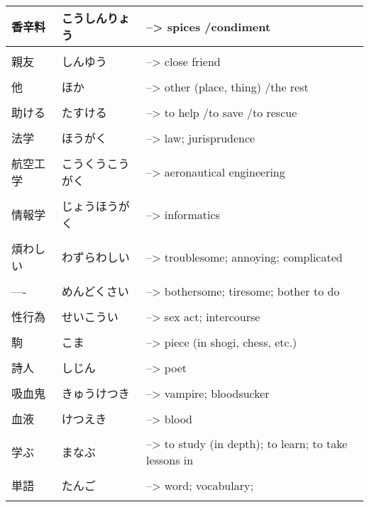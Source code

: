 \documentclass{article}
\begin{document}
\begin{tabular}{ l | l p{14cm} }
香辛料 &こうしんりょう &--> spices /condiment						\\ \hline\\[-1em]
親友 &しんゆう &--> close friend							\\ \hline\\[-1em]
他 &ほか &--> other (place, thing) /the rest			\\ \hline\\[-1em]
助ける &たすける &--> to help /to save /to rescue        \\ \hline\\[-1em]
法学 &ほうがく &--> law; jurisprudence  \\ \hline\\[-1em]
航空工学 &こうくうこうがく &--> aeronautical engineering   \\ \hline\\[-1em]
情報学 &じょうほうがく &--> informatics   \\ \hline\\[-1em]
煩わしい &わずらわしい &--> troublesome; annoying; complicated   \\ \hline\\[-1em]
---- &めんどくさい &--> bothersome; tiresome; bother to do   \\ \hline\\[-1em]
性行為 &せいこうい &--> sex act; intercourse   \\ \hline\\[-1em]
駒 &こま &--> piece (in shogi, chess, etc.)   \\ \hline\\[-1em]
詩人 &しじん &--> poet   \\ \hline\\[-1em]
吸血鬼 &きゅうけつき &--> vampire; bloodsucker   \\ \hline\\[-1em]
血液 &けつえき &--> blood   \\ \hline\\[-1em]
学ぶ &まなぶ &--> to study (in depth); to learn; to take lessons in   \\ \hline\\[-1em]
単語 &たんご &--> word; vocabulary;   \\ \hline\\[-1em]

\end{tabular}
\end{document}
